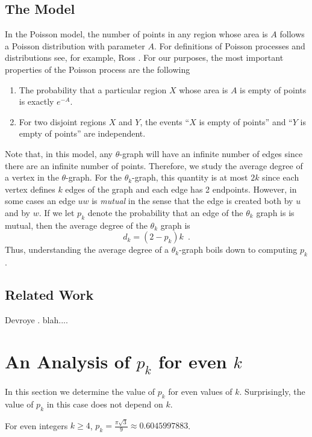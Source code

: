 \documentclass{patmorin}
\begin{document}
\subsection{The Model}

In the Poisson model, the number of points in any region
whose area is $A$ follows a Poisson distribution with parameter $A$.
For definitions of Poisson processes and distributions see, for example,
Ross \cite[Chapter~2]{ross:introduction}.  For our purposes, the most
important properties of the Poisson process are the following
\begin{enumerate}
\item The probability  that a particular region $X$ whose area is $A$
   is empty of points is exactly $e^{-A}$.
\item For two disjoint regions $X$ and $Y$, the events ``$X$ is empty
   of points'' and ``$Y$ is empty of points'' are independent.
\end{enumerate}
Note that, in this model, any $\theta$-graph will have an infinite number
of edges since there are an infinite number of points.  Therefore,
we study the average degree of a vertex in the $\theta$-graph.  For the
$\theta_k$-graph, this quantity is at most $2k$ since each vertex defines
$k$ edges of the graph and each edge has 2 endpoints.  However, in some
cases an edge $uw$ is \emph{mutual} in the sense that the edge is created
both by $u$ and by $w$.  If we let $p_k$ denote the probability that an
edge of the $\theta_k$ graph is is mutual, then the average degree of
the $\theta_k$ graph is
\[
    d_k = (2-p_k)k \enspace .
\]
Thus, understanding the average degree of a $\theta_k$-graph boils down
to computing $p_k$.

\subsection{Related Work}

Devroye \etal. blah.... 



\section{An Analysis of $p_k$ for even $k$}

In this section we determine the value of $p_k$ for even values of $k$.
Surprisingly, the value of $p_k$ in this case does not depend on $k$.

\begin{lem}
 For even integers $k\ge 4$, $p_k=\frac{\pi\sqrt{3}}{9}\approx 0.6045997883$.
\end{lem}
\end{document}
